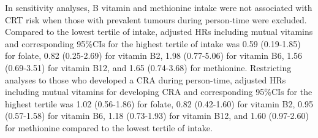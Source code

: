 \noindent In sensitivity analyses, B vitamin and methionine intake were not associated with CRT risk when those with prevalent tumours during person-time were excluded. Compared to the lowest tertile of intake, adjusted HRs including mutual vitamins and corresponding 95\%CIs for the highest tertile of intake was 0.59 (0.19-1.85) for folate, 0.82 (0.25-2.69) for vitamin B2, 1.98 (0.77-5.06) for vitamin B6, 1.56 (0.69-3.51) for vitamin B12, and 1.65 (0.74-3.68) for methionine. Restricting analyses to those who developed a CRA during person-time, adjusted HRs including mutual vitamins for developing CRA and corresponding 95\%CIs for the highest tertile was 1.02 (0.56-1.86) for folate, 0.82 (0.42-1.60) for vitamin B2, 0.95 (0.57-1.58) for vitamin B6, 1.18 (0.73-1.93) for vitamin B12, and 1.60 (0.97-2.60) for methionine compared to the lowest tertile of intake.

